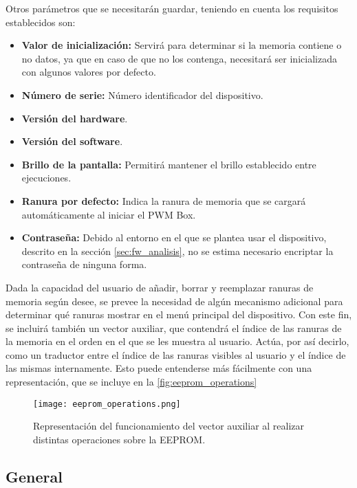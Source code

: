 Otros parámetros que se necesitarán guardar, teniendo en cuenta los requisitos establecidos son:

\begin{itemize}
    \item\textbf{Valor de inicialización:} Servirá para determinar si la memoria contiene o no datos, ya que en caso de que no los contenga, necesitará ser inicializada con algunos valores por defecto.
    \item\textbf{Número de serie:} Número identificador del dispositivo.
    \item\textbf{Versión del hardware}.
    \item\textbf{Versión del software}.
    \item\textbf{Brillo de la pantalla:} Permitirá mantener el brillo establecido entre ejecuciones.
    \item\textbf{Ranura por defecto:} Indica la ranura de memoria que se cargará automáticamente al iniciar el PWM Box.
    \item\textbf{Contraseña:} Debido al entorno en el que se plantea usar el dispositivo, descrito en la sección \ref{sec:fw_analisis}, no se estima necesario encriptar la contraseña de ninguna forma.
\end{itemize}

Dada la capacidad del usuario de añadir, borrar y reemplazar ranuras de memoria según desee, se prevee la necesidad de algún mecanismo adicional para determinar qué ranuras mostrar en el menú principal del dispositivo. Con este fin, se incluirá también un vector auxiliar, que contendrá el índice de las ranuras de la memoria en el orden en el que se les muestra al usuario. Actúa, por así decirlo, como un traductor entre el índice de las ranuras visibles al usuario y el índice de las mismas internamente. Esto puede entenderse más fácilmente con una representación, que se incluye en la \autoref{fig:eeprom_operations}

\begin{figure}[h!]
    \centering
    \texttt{[image: eeprom\_operations.png]}
    \caption{Representación del funcionamiento del vector auxiliar al realizar distintas operaciones sobre la EEPROM.}
    \label{fig:eeprom_operations}
\end{figure}

\subsection{General}

